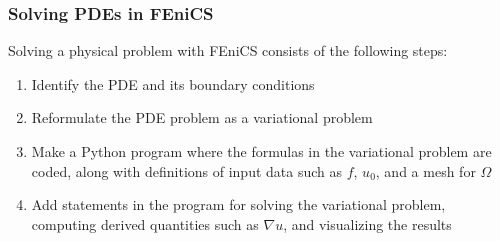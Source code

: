 \begin{frame}
  \frametitle{Solving PDEs in FEniCS}

  Solving a physical problem with FEniCS consists of the following steps:
  \begin{enumerate}
  \item
    Identify the PDE and its boundary conditions
  \item
    Reformulate the PDE problem as a variational problem
  \item
    Make a Python program where the formulas in the variational
    problem are coded, along with definitions of input data such as $f$,
    $u_0$, and a mesh for $\Omega$
  \item
    Add statements in the program for solving the variational problem,
    computing derived quantities such as $\nabla u$, and visualizing
    the results
  \end{enumerate}

\end{frame}
